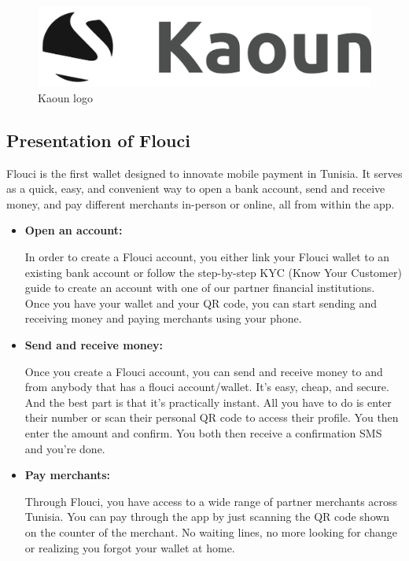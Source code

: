 \begin{spacing}{1.2}
\begin{figure}[!ht]\centering
\includegraphics[scale=0.3]{images/kaounlogo.png}
\caption{Kaoun logo}
\label{fig:fig1}
\end{figure}


\subsection{Presentation of Flouci}
Flouci is the first wallet designed to innovate mobile payment in Tunisia. It serves as a quick, easy, and convenient way to open a bank account, send and receive money, and pay different merchants in-person or online, all from within the app. 
\begin{itemize}
  \item \textbf{Open an account:}
  
  In order to create a Flouci account, you either link your Flouci wallet to an existing bank account or follow the step-by-step KYC (Know Your Customer) guide to create an account with one of our partner financial institutions. Once you have your wallet and your QR code, you can start sending and receiving money and paying merchants using your phone. 

  \item \textbf{Send and receive money:}
  
  Once you create a Flouci account, you can send and receive money to and from anybody that has a flouci account/wallet. It's easy, cheap, and secure. And the best part is that it's practically instant. All you have to do is enter their number or scan their personal QR code to access their profile. You then enter the amount and confirm. You both then receive a confirmation SMS and you're done.
  \item \textbf{Pay merchants:}
  
  Through Flouci, you have access to a wide range of partner merchants across Tunisia. You can pay through the app by just scanning the QR code shown on the counter of the merchant. No waiting lines, no more looking for change or realizing you forgot your wallet at home. 
\end{itemize}


\end{spacing}
